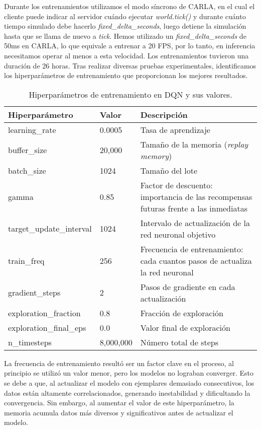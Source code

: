 Durante los entrenamientos utilizamos el modo síncrono de CARLA, en el cual el cliente puede indicar al servidor cuándo ejecutar \textit{world.tick()} y durante cuánto tiempo simulado debe hacerlo \textit{fixed\_delta\_seconds}, luego detiene la simulación hasta que se llama de nuevo a \textit{tick}. Hemos utilizado un \textit{fixed\_delta\_seconds} de 50ms en CARLA, lo que equivale a entrenar a 20 \ac{FPS}, por lo tanto, en inferencia necesitamos operar al menos a esta velocidad. Los entrenamientos tuvieron una duración de 26 horas. Tras realizar diversas pruebas experimentales, identificamos los hiperparámetros de entrenamiento que proporcionan los mejores resultados.
\begin{table}[ht]
\centering
\begin{tabular}{|l|l|l|}
\hline
\textbf{Hiperparámetro} & \textbf{Valor} & \textbf{Descripción} \\ \hline
learning\_rate & 0.0005 & Tasa de aprendizaje \\ \hline
buffer\_size & 20,000 & Tamaño de la memoria (\textit{replay memory}) \\ \hline
batch\_size & 1024 & Tamaño del lote \\ \hline
gamma & 0.85 & Factor de descuento: importancia de las recompensas futuras frente a las inmediatas \\ \hline
target\_update\_interval & 1024 & Intervalo de actualización de la red neuronal objetivo \\ \hline
train\_freq & 256 & Frecuencia de entrenamiento: cada cuantos pasos de actualiza la red neuronal \\ \hline
gradient\_steps & 2 & Pasos de gradiente en cada actualización \\ \hline
exploration\_fraction & 0.8 & Fracción de exploración \\ \hline
exploration\_final\_eps & 0.0 & Valor final de exploración \\ \hline
n\_timesteps & 8,000,000 & Número total de steps \\ \hline
\end{tabular}
\caption{Hiperparámetros de entrenamiento en \ac{DQN} y sus valores.}
\label{tab:hiperparametros}
\end{table}

La frecuencia de entrenamiento resultó ser un factor clave en el proceso, al principio se utilizó un valor menor, pero los modelos no lograban converger. Esto se debe a que, al actualizar el modelo con ejemplares demasiado consecutivos, los datos están altamente correlacionados, generando inestabilidad y dificultando la convergencia. Sin embargo, al aumentar el valor de este hiperparámetro, la memoria acumula datos más diversos y significativos antes de actualizar el modelo.

